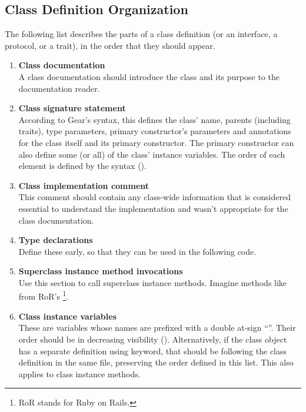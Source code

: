 \subsection{Class Definition Organization}

The following list describes the parts of a class definition (or an interface, a protocol, or a trait), in the order that they should appear. 

\begin{enumerate}
\item {\bfseries Class documentation} \hfill \\
A class documentation should introduce the class and its purpose to the documentation reader. 

\item {\bfseries Class signature statement} \hfill \\
According to Gear's syntax, this defines the class' name, parents (including traits), type parameters, primary constructor's parameters and annotations for the class itself and its primary constructor. The primary constructor can also define some (or all) of the class' instance variables. The order of each element is defined by the syntax (). 

\item {\bfseries Class implementation comment} \hfill \\
This comment should contain any class-wide information that is considered essential to understand the implementation and wasn't appropriate for the class documentation. 

\item {\bfseries Type declarations} \hfill \\
Define these early, so that they can be used in the following code. 

\item {\bfseries Superclass instance method invocations} \hfill \\
Use this section to call superclass instance methods. Imagine methods like  from RoR's \footnote{RoR stands for Ruby on Rails.}. 

\item {\bfseries Class instance variables} \hfill \\
These are variables whose names are prefixed with a double at-sign ``''. Their order should be in decreasing visibility (). Alternatively, if the class object has a separate definition using  keyword, that should be following the class definition in the same file, preserving the order defined in this list. This also applies to class instance methods. 


\end{enumerate}
